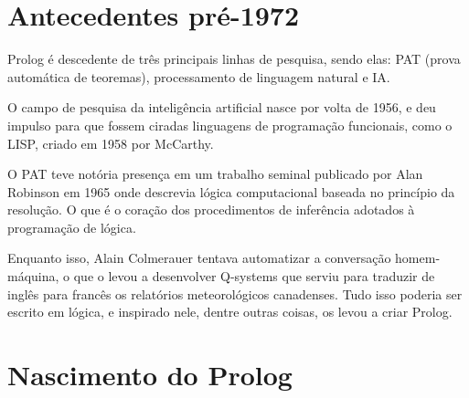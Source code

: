 
\section{Antecedentes pré-1972}
Prolog é descedente de três principais linhas de pesquisa, sendo elas: PAT
(prova automática de teoremas), processamento de linguagem natural e IA.
\cite{korner2022fiftyyearsprolog}

O campo de pesquisa da inteligência artificial nasce por volta de 1956, e deu
impulso para que fossem ciradas linguagens de programação funcionais, como o
LISP, criado em 1958 por McCarthy. 

O PAT teve notória presença em um trabalho seminal publicado por Alan Robinson
em 1965 onde descrevia lógica computacional baseada no princípio da resolução. O
que é o coração dos procedimentos de inferência adotados à programação de
lógica.

Enquanto isso, Alain Colmerauer tentava automatizar a conversação homem-máquina,
o que o levou a desenvolver Q-systems que serviu para traduzir de inglês para
francês os relatórios meteorológicos canadenses. Tudo isso poderia ser escrito
em lógica, e inspirado nele, dentre outras coisas, os levou a criar Prolog.


\section{Nascimento do Prolog}

